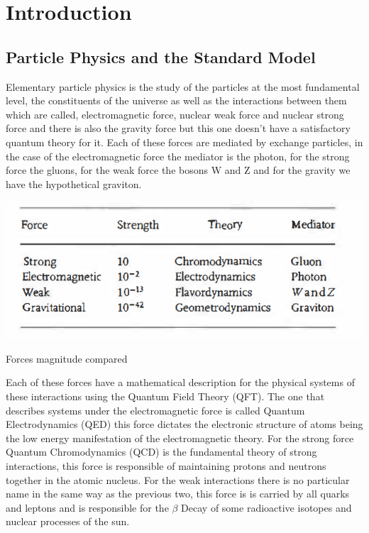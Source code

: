\chapter{Introduction}
\label{ch1}



\section{Particle Physics and the Standard Model}

Elementary particle physics is the study of the particles at the most fundamental level, the constituents of the universe as well as the interactions between them which are called, electromagnetic force, nuclear weak force and nuclear strong force and there is also the gravity force but this one doesn't have a satisfactory quantum theory for it. Each of these forces are mediated by exchange particles, in the case of the electromagnetic force the mediator is the photon, for the strong force the gluons, for the weak force the bosons W and Z and for the gravity we have the hypothetical graviton.  \cite{Griff}  

\includegraphics[scale=1]{table1.png}
\caption{Forces magnitude compared}

Each of these forces have a mathematical description for the physical systems of these interactions using the Quantum Field Theory (QFT). The one that describes systems under the electromagnetic force is called Quantum Electrodynamics (QED) this force dictates the electronic structure of atoms being the low energy manifestation of the electromagnetic theory. For the strong force Quantum Chromodynamics (QCD) is the fundamental theory of strong interactions, this force is responsible of maintaining protons and neutrons together in the atomic nucleus. For the weak interactions there is no particular name in the same way as the previous two, this force is is carried by all quarks and leptons and is responsible for the $\beta$ Decay of some radioactive isotopes and nuclear processes of the sun. \cite{mppthomson}   


